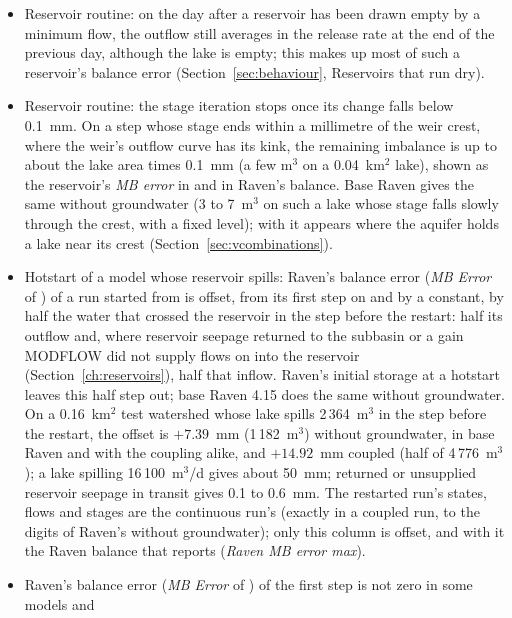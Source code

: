 \begin{itemize}
steady inflow, restarted from 0.5 to 1~d; 0.009~mm from 0.25 to 1~d). The take itself is restored exactly
(); the difference is Raven's averaging, and a restart with the same  is exact.
\item Reservoir routine: on the day after a reservoir has been drawn empty by a minimum flow, the outflow still averages in
the release rate at the end of the previous day, although the lake is empty; this makes up most of such a reservoir's balance
error (Section~\ref{sec:behaviour}, Reservoirs that run dry).
\item Reservoir routine: the stage iteration stops once its change falls below 0.1~mm. On a step whose stage ends within a
millimetre of the weir crest, where the weir's outflow curve has its kink, the remaining imbalance is up to about the lake
area times 0.1~mm (a few m$^3$ on a 0.04~km$^2$ lake), shown as the reservoir's \emph{MB error} in
 and in Raven's balance. Base Raven gives the same without groundwater (3 to 7~m$^3$ on such a
lake whose stage falls slowly through the crest, with a fixed  level); with 
it appears where the aquifer holds a lake near its crest (Section~\ref{sec:vcombinations}).
\item Hotstart of a model whose reservoir spills: Raven's balance error (\emph{MB Error} of ) of a
run started from  is offset, from its first step on and by a constant, by half the water that crossed the
reservoir in the step before the restart: half its outflow and, where reservoir seepage returned to the subbasin or a gain
MODFLOW did not supply flows on into the reservoir (Section~\ref{ch:reservoirs}), half that inflow. Raven's initial storage
at a hotstart leaves this half step out; base Raven 4.15 does the same without groundwater. On a 0.16~km$^2$ test watershed
whose lake spills 2\,364~m$^3$ in the step before the restart, the offset is $+7.39$~mm (1\,182~m$^3$) without groundwater,
in base Raven and with the coupling alike, and $+14.92$~mm coupled (half of 4\,776~m$^3$); a lake spilling 16\,100~m$^3$/d gives about
50~mm; returned or unsupplied reservoir seepage in transit gives 0.1 to 0.6~mm. The restarted run's states, flows and stages
are the continuous run's (exactly in a coupled run, to the digits of Raven's  without groundwater); only
this column is offset, and with it the Raven balance that  reports (\emph{Raven MB error max}).
\item Raven's balance error (\emph{MB Error} of ) of the first step is not zero in some models and

\end{itemize}
